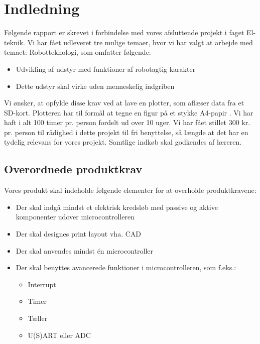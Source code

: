 \chapter{Indledning}
\label{ch:indledning}



Følgende rapport er skrevet i forbindelse med vores afsluttende
projekt i faget El-teknik.  Vi har fået udleveret tre mulige temaer,
hvor vi har valgt at arbejde med temaet: Robotteknologi, som omfatter
følgende:

\begin{itemize}
\item Udvikling af udstyr med funktioner af robotagtig karakter
\item Dette udstyr skal virke uden menneskelig indgriben
\end{itemize}

Vi ønsker, at opfylde disse krav ved at lave en plotter, som aflæser
data fra et SD-kort. Plotteren har til formål at tegne en figur på et
stykke A4-papir . Vi
har haft i alt 100 timer pr. person fordelt ud over 10 uger. Vi har
fået stillet 300 kr. pr. person til rådighed i dette projekt til fri
benyttelse, så længde at det har en tydelig relevans for vores
projekt. Samtlige indkøb skal godkendes af læreren.


\section{Overordnede produktkrav}

Vores produkt skal indeholde følgende elementer for at overholde
produktkravene:

\begin{itemize}
\item Der skal indgå mindst et elektrisk kredsløb med passive og
  aktive komponenter udover microcontrolleren
\item Der skal designes print layout vha. CAD
\item Der skal anvendes mindst én microcontroller
\item Der skal benyttes avancerede funktioner i microcontrolleren, som f.eks.:
  \begin{itemize}
  \item Interrupt
  \item Timer
  \item Tæller
  \item U(S)ART eller ADC
  \end{itemize}
\end{itemize}


